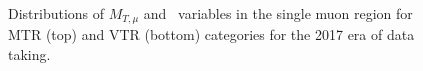 \begin{figure}[htbp]
{    }
  \caption{Distributions of $M_{T,\mu}$ and \mindphinomu~variables in the single muon region for MTR (top) and VTR (bottom) categories for the 2017 era of data taking.}
  \label{fig:2017_Wmunu_2}
\end{figure}

